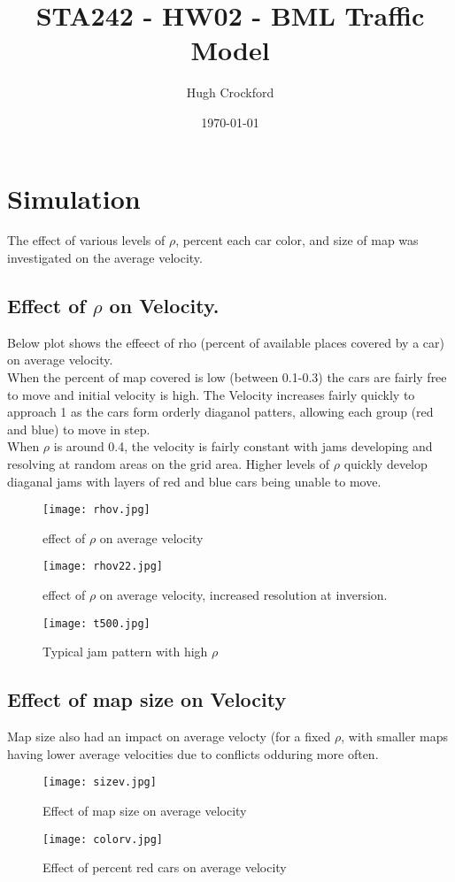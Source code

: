 \documentclass[12pt]{article}
\title{STA242 - HW02 - BML Traffic Model}
\author{Hugh Crockford}
\date{\today}
\begin{document}
	\section{Simulation}
		The effect of various levels of \(\rho\), percent each car color, and size of map was investigated on the average velocity.
		\subsection{Effect of \(\rho\) on Velocity.}
			Below plot shows the effeect of rho (percent of available places covered by a car) on average velocity.\\
			When the percent of map covered is low (between 0.1-0.3) the cars are fairly free to move and initial velocity is high. The Velocity increases fairly quickly to approach 1 as the cars form orderly diaganol patters, allowing each group (red and blue) to move in step.\\
			When \(\rho\) is around 0.4, the velocity is fairly constant with jams developing and resolving at random areas on the grid area.
			Higher levels of \(\rho\) quickly develop diaganal jams with layers of red and blue cars being unable to move.
			\begin{figure}[h!b]
				\centering
				\texttt{[image: rhov.jpg]}
				\caption{effect of \(\rho\) on average velocity}
				\texttt{[image: rhov22.jpg]}
				\caption{effect of \(\rho\) on average velocity, increased resolution at inversion.}
			\end{figure}

			\begin{figure}
				\centering
				\texttt{[image: t500.jpg]}	%
				\caption{Typical jam pattern with high \(\rho\) }
			\end{figure}
		\subsection{Effect of map size on Velocity}
			Map size also had an impact on average velocty (for a fixed \(\rho\), with smaller maps having lower average velocities due to conflicts odduring more often.

			\begin{figure}[hb!]
				\centering
				\texttt{[image: sizev.jpg]}
				\caption{Effect of map size on average velocity}
				\texttt{[image: colorv.jpg]}
				\caption{Effect of percent red cars on average velocity}
			\end{figure}
\end{document}
